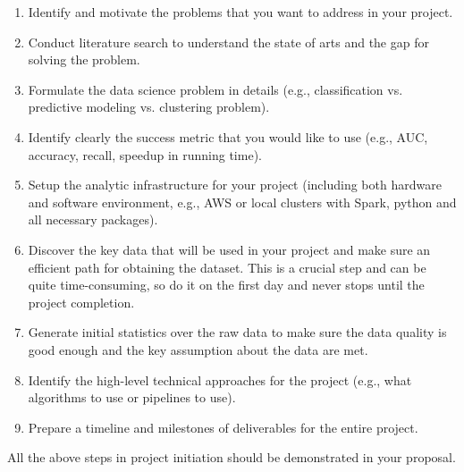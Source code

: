 \documentclass[journal]{IEEEtran}
\begin{document}
\begin{enumerate}
\item Identify and motivate the problems that you want to address in your project.
\item Conduct literature search to understand the state of arts and the gap for solving the problem.
\item Formulate the data science problem in details (e.g.,  classification vs. predictive modeling vs. clustering problem). 
\item Identify clearly the success metric that you would like to use (e.g., AUC, accuracy, recall, speedup in running time). 
\item Setup the analytic infrastructure for your project (including both hardware and software environment, e.g., AWS or local clusters with Spark, python and all necessary packages).
\item Discover the key data that will be used in your project and make sure an efficient path for obtaining the dataset. This is a crucial step and can be quite time-consuming, so do it on the first day and never stops until the project completion.
\item Generate initial statistics over the raw data to make sure the data quality is good enough and the key assumption about the data are met. 
\item Identify the high-level technical approaches for the project (e.g., what algorithms to use or pipelines to use). 
\item Prepare a timeline and milestones of deliverables for the entire project.
\end{enumerate}

All the above steps in project initiation should be demonstrated in your proposal.
\end{document}
